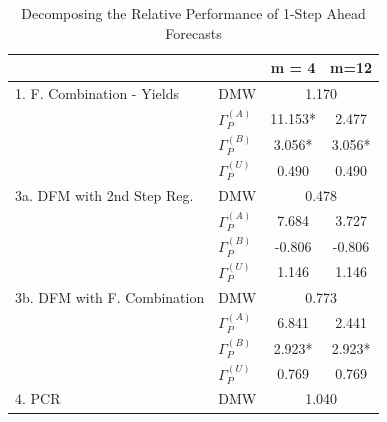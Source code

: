 \documentclass[11pt]{article}
\renewcommand{\baselinestretch}{1.5}
\begin{document}
\normalsize \clearpage
\renewcommand{\baselinestretch}{1} 
\begin{table}  
\caption{Decomposing the Relative Performance of 1-Step Ahead Forecasts}                                                        
\center                                                                
\begin{tabular}{|l|l|c|c|}                                             
\hline                                                                 
&&m = 4&m=12 \\                                                        
\hline                                                                 
1. F. Combination - Yields          & DMW&\multicolumn{2}{|c|}{1.170}\\
\hline                                                                 
& $\Gamma_P^{(A)}$&11.153*&2.477\\                                     
& $\Gamma_P^{(B)}$&3.056*&3.056*\\                                     
& $\Gamma_P^{(U)}$&0.490&0.490\\                                       
\hline                                                                 
3a. DFM with 2nd Step Reg.          & DMW&\multicolumn{2}{|c|}{0.478}\\
\hline                                                                 
& $\Gamma_P^{(A)}$&7.684&3.727\\                                       
& $\Gamma_P^{(B)}$&-0.806&-0.806\\                                     
& $\Gamma_P^{(U)}$&1.146&1.146\\                                       
\hline                                                                 
3b. DFM with F. Combination         & DMW&\multicolumn{2}{|c|}{0.773}\\
\hline                                                                 
& $\Gamma_P^{(A)}$&6.841&2.441\\                                       
& $\Gamma_P^{(B)}$&2.923*&2.923*\\                                     
& $\Gamma_P^{(U)}$&0.769&0.769\\                                       
\hline                                                                 
4. PCR                              & DMW&\multicolumn{2}{|c|}{1.040}\\
\hline                                                                 

\end{tabular}
\end{table}
\end{document}
